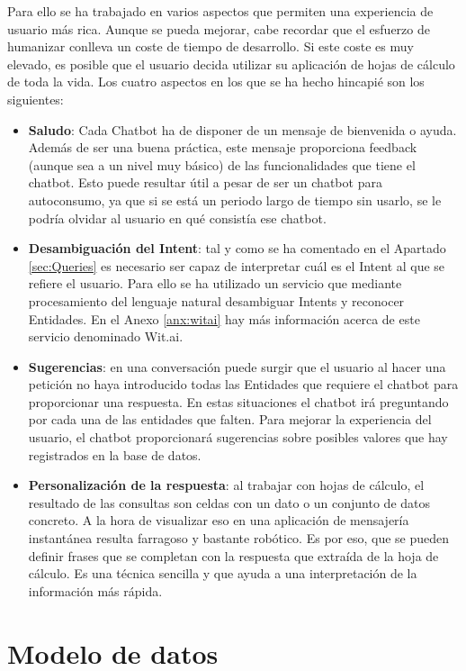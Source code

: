 Para ello se ha trabajado en varios aspectos que permiten una experiencia de usuario más rica. Aunque se pueda mejorar, cabe recordar que el esfuerzo de humanizar conlleva un coste de tiempo de desarrollo. Si este coste es muy elevado, es posible que el usuario decida utilizar su aplicación de hojas de cálculo de toda la vida. Los cuatro aspectos en los que se ha hecho hincapié son los siguientes:
\begin{itemize}
	\item \textbf{Saludo}: Cada Chatbot ha de disponer de un mensaje de bienvenida o ayuda. Además de ser una buena práctica, este mensaje proporciona feedback (aunque sea a un nivel muy básico) de las funcionalidades que tiene el chatbot. Esto puede resultar útil a pesar de ser un chatbot para autoconsumo, ya que si se está un periodo largo de tiempo sin usarlo, se le podría olvidar al usuario en qué consistía ese chatbot.
	\item \textbf{Desambiguación del Intent}: tal y como se ha comentado en el Apartado \ref{sec:Queries} es necesario ser capaz de interpretar cuál es el Intent al que se refiere el usuario. Para ello se ha utilizado un servicio que mediante procesamiento del lenguaje natural desambiguar Intents y reconocer Entidades. En el Anexo \ref{anx:witai} hay más información acerca de este servicio denominado Wit.ai.
	\item \textbf{Sugerencias}: en una conversación puede surgir que el usuario al hacer una petición no haya introducido todas las Entidades que requiere el chatbot para proporcionar una respuesta. En estas situaciones el chatbot irá preguntando por cada una de las entidades que falten. Para mejorar la experiencia del usuario, el chatbot proporcionará sugerencias sobre posibles valores que hay registrados en la base de datos.
	\item \textbf{Personalización de la respuesta}: al trabajar con hojas de cálculo, el resultado de las consultas son celdas con un dato o un conjunto de datos concreto. A la hora de visualizar eso en una aplicación de mensajería instantánea resulta farragoso y bastante robótico. Es por eso, que se pueden definir frases que se completan con la respuesta que extraída de la hoja de cálculo. Es una técnica sencilla y que ayuda a una interpretación de la información más rápida.
\end{itemize}

\section{Modelo de datos}
\label{sec:DataModel}

